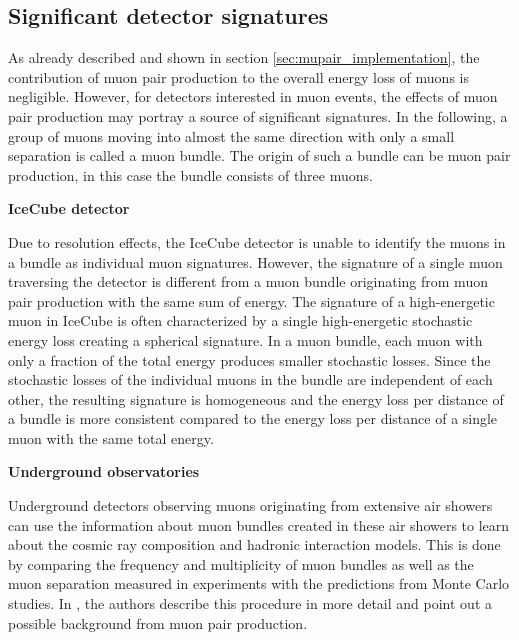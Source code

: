 \subsection{Significant detector signatures}
\label{sec:signatures}

As already described and shown in section \ref{sec:mupair_implementation}, the contribution of muon pair production to the overall energy loss of muons is negligible.
However, for detectors interested in muon events, the effects of muon pair production may portray a source of significant signatures.
In the following, a group of muons moving into almost the same direction with only a small separation is called a muon bundle.
The origin of such a bundle can be muon pair production, in this case the bundle consists of three muons.

\textbf{IceCube detector}

Due to resolution effects, the IceCube detector is unable to identify the muons in a bundle as individual muon signatures.
However, the signature of a single muon traversing the detector is different from a muon bundle originating from muon pair production with the same sum of energy.
The signature of a high-energetic muon in IceCube is often characterized by a single high-energetic stochastic energy loss creating a spherical signature.
In a muon bundle, each muon with only a fraction of the total energy produces smaller stochastic losses.
Since the stochastic losses of the individual muons in the bundle are independent of each other, the resulting signature is homogeneous and the energy loss per distance of a bundle is more consistent compared to the energy loss per distance of a single muon with the same total energy. 

\textbf{Underground observatories}

Underground detectors observing muons originating from extensive air showers can use the information about muon bundles created in these air showers to learn about the cosmic ray composition and hadronic interaction models.
This is done by comparing the frequency and multiplicity of muon bundles as well as the muon separation measured in experiments with the predictions from Monte Carlo studies.
In \cite{MupairInRock}, the authors describe this procedure in more detail and point out a possible background from muon pair production.

